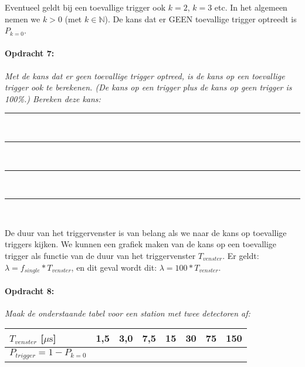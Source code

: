 \bigskip{}

Eventueel geldt bij een toevallige trigger ook $k=2$, $k=3$ etc.
In het algemeen nemen we $k>0$ (met $k\mathbb{\in N}$). De kans
dat er GEEN toevallige trigger optreedt is $P_{k=0}$.

\begin{minipage}[t]{1\columnwidth}%

\paragraph{Opdracht 7:}

\textit{Met de kans dat er geen toevallige trigger optreed, is de
kans op een toevallige trigger ook te berekenen. (De kans op een trigger
plus de kans op geen trigger is 100\%.) Bereken deze kans:}

\begin{center}
    \rule{\textwidth}{0.3mm}\\
    \rule{\textwidth}{0.3mm}\\
    \rule{\textwidth}{0.3mm}\\
    \rule{\textwidth}{0.3mm}\\
\end{center}
\end{minipage}

\bigskip{}

De duur van het triggervenster is van belang als we naar de kans op
toevallige triggers kijken. We kunnen een grafiek maken van de kans
op een toevallige trigger als functie van de duur van het triggervenster
$T_{venster}$. Er geldt: $\lambda=f_{single}*T_{venster}$, en dit
geval wordt dit: $\lambda=100*T_{venster}$$ $. 

\begin{minipage}[t]{1\columnwidth}%

\paragraph{Opdracht 8:}

\textit{Maak de onderstaande tabel voor een station met twee detectoren
af:}

\bigskip{}


\begin{tabular}{|x{.20\textwidth}|x{.07\textwidth}|x{.07\textwidth}
                |x{.07\textwidth}|x{.07\textwidth}|x{.07\textwidth}
                |x{.07\textwidth}|x{.07\textwidth}|}
    \hline 
    $T_{venster}$ {[}$\mu\mathrm{s}${]} & 1,5 & 3,0 & 7,5 & 15 & 30 & 75 & 150\tabularnewline
    \hline 
    $P_{trigger}=1-P_{k=0}$ &  &  &  &  &  &  & \tabularnewline
    \hline 
\end{tabular}
\end{minipage}

